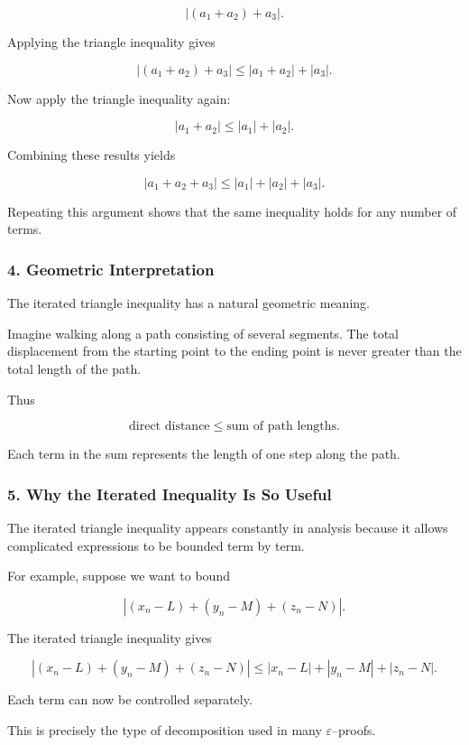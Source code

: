 \[
| (a_1 + a_2) + a_3 |.
\]

Applying the triangle inequality gives

\[
| (a_1 + a_2) + a_3 |
\le
|a_1 + a_2| + |a_3|.
\]

Now apply the triangle inequality again:

\[
|a_1 + a_2|
\le
|a_1| + |a_2|.
\]

Combining these results yields

\[
|a_1 + a_2 + a_3|
\le
|a_1| + |a_2| + |a_3|.
\]

Repeating this argument shows that the same inequality holds for any
number of terms.

\bigskip

\subsubsection*{4. Geometric Interpretation}

The iterated triangle inequality has a natural geometric meaning.

Imagine walking along a path consisting of several segments.  
The total displacement from the starting point to the ending point is
never greater than the total length of the path.

Thus

\[
\text{direct distance} \le \text{sum of path lengths}.
\]

Each term in the sum represents the length of one step along the path.

\bigskip

\subsubsection*{5. Why the Iterated Inequality Is So Useful}

The iterated triangle inequality appears constantly in analysis because
it allows complicated expressions to be bounded term by term.

For example, suppose we want to bound

\[
|(x_n - L) + (y_n - M) + (z_n - N)|.
\]

The iterated triangle inequality gives

\[
|(x_n - L) + (y_n - M) + (z_n - N)|
\le
|x_n - L| + |y_n - M| + |z_n - N|.
\]

Each term can now be controlled separately.

This is precisely the type of decomposition used in many
$\varepsilon$--proofs.

